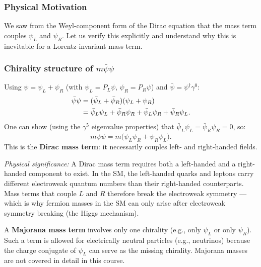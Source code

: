 \documentclass[../main.tex]{subfiles}
\begin{document}
\subsubsection*{Physical Motivation}

We saw from the Weyl-component form of the Dirac equation that the mass term couples $\psi_L$ and $\psi_R$.  Let us verify this explicitly and understand why this is inevitable for a Lorentz-invariant mass term.

\subsubsection*{Chirality structure of $m\bar\psi\psi$}

Using $\psi = \psi_L + \psi_R$ (with $\psi_L = P_L\psi$, $\psi_R = P_R\psi$) and $\bar\psi = \psi^\dagger\gamma^0$:
\begin{align}
  \bar\psi\psi
  &= (\bar\psi_L + \bar\psi_R)(\psi_L + \psi_R) \notag\\
  &= \bar\psi_L\psi_L + \bar\psi_R\psi_R + \bar\psi_L\psi_R + \bar\psi_R\psi_L.
\end{align}
One can show (using the $\gamma^5$ eigenvalue properties) that $\bar\psi_L\psi_L = \bar\psi_R\psi_R = 0$, so:
\begin{equation}
  \boxed{m\bar\psi\psi = m\bigl(\bar\psi_L\psi_R + \bar\psi_R\psi_L\bigr).}
  \label{eq:lec08:dirac-mass}
\end{equation}
This is the \textbf{Dirac mass term}: it necessarily couples left- and right-handed fields.

\textit{Physical significance:} A Dirac mass term requires both a left-handed and a right-handed component to exist.  In the SM, the left-handed quarks and leptons carry different electroweak quantum numbers than their right-handed counterparts.  Mass terms that couple $L$ and $R$ therefore break the electroweak symmetry — which is why fermion masses in the SM can only arise after electroweak symmetry breaking (the Higgs mechanism).

\begin{remark}
A \textbf{Majorana mass term} involves only one chirality (e.g., only $\psi_L$ or only $\psi_R$).  Such a term is allowed for electrically neutral particles (e.g., neutrinos) because the charge conjugate of $\psi_L$ can serve as the missing chirality.  Majorana masses are not covered in detail in this course.
\end{remark}

\end{document}
